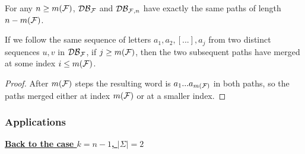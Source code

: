 \documentclass{article}
\begin{document}
\begin{remark}
	For any $n \geq m(\mathcal{F})$, $\mathcal{DB}_{\mathcal{F}}$ and $\mathcal{DB}_{\mathcal{F}, n}$ have exactly the same paths of length $n - m(\mathcal{F})$.
\end{remark}

\begin{lemma}
	If we follow the same sequence of letters $a_1, a_2, [...], a_j$ from two distinct sequences $u, v$ in $\mathcal{DB}_{\mathcal{F}}$, if $j \geq m(\mathcal{F})$, then the two subsequent paths have merged at some index $i \leq m(\mathcal{F})$.
\end{lemma}
\begin{proof}
	After $m(\mathcal{F})$ steps the resulting word is $a_1...a_{m(\mathcal{F})}$ in both paths, so the paths merged either at index $m(\mathcal{F})$ or at a smaller index.
\end{proof}

\subsubsection{Applications}

\noindent
\underline{\textbf{Back to the case $k = n-1$, $|\Sigma| = 2$}} \\
\end{document}
